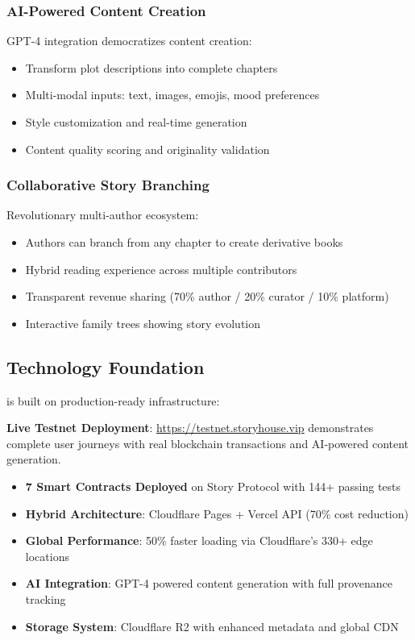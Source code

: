 \subsubsection{AI-Powered Content Creation}
GPT-4 integration democratizes content creation:
\begin{itemize}
    \item Transform plot descriptions into complete chapters
    \item Multi-modal inputs: text, images, emojis, mood preferences
    \item Style customization and real-time generation
    \item Content quality scoring and originality validation
\end{itemize}

\subsubsection{Collaborative Story Branching}
Revolutionary multi-author ecosystem:
\begin{itemize}
    \item Authors can branch from any chapter to create derivative books
    \item Hybrid reading experience across multiple contributors
    \item Transparent revenue sharing (70\% author / 20\% curator / 10\% platform)
    \item Interactive family trees showing story evolution
\end{itemize}

\subsection{Technology Foundation}

\storyhouse{} is built on production-ready infrastructure:

\begin{keypoint}
\textbf{Live Testnet Deployment}: \url{https://testnet.storyhouse.vip} demonstrates complete user journeys with real blockchain transactions and AI-powered content generation.
\end{keypoint}

\begin{itemize}
    \item \textbf{7 Smart Contracts Deployed} on Story Protocol with 144+ passing tests
    \item \textbf{Hybrid Architecture}: Cloudflare Pages + Vercel API (70\% cost reduction)
    \item \textbf{Global Performance}: 50\% faster loading via Cloudflare's 330+ edge locations
    \item \textbf{AI Integration}: GPT-4 powered content generation with full provenance tracking
    \item \textbf{Storage System}: Cloudflare R2 with enhanced metadata and global CDN
\end{itemize}

